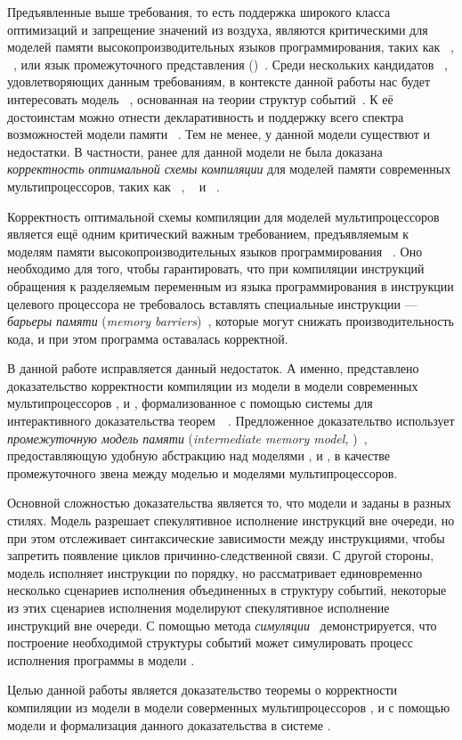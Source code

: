 Предъявленные выше требования, 
то есть поддержка широкого класса оптимизаций и 
запрещение значений из воздуха, являются 
критическими для моделей памяти высокопроизводительных 
языков программирования, таких как \CPP~\cite{Batty-al:POPL11}, 
\Java~\cite{Manson-al:POPL05}, или язык промежуточного представления \LLVM 
(\LLVMIR)~\cite{Chakraborty-Vafeiadis:CGO17}.
Среди нескольких кандидатов~%
\cite{Kang-al:POPL17,Paviotti-al:ESOP20,Jagadeesan-al:OOPSLA2020}, 
удовлетворяющих данным требованиям, в контексте данной работы нас будет 
интересовать модель \Wkm~\cite{Chakraborty-Vafeiadis:POPL19}, 
основанная на теории структур событий~\cite{Winskel:86}. 
К её достоинстам можно отнести декларативность и поддержку 
всего спектра возможностей модели памяти \CPP~\cite{Batty-al:POPL11}. 
Тем не менее, у данной модели существют и недостатки. 
В частности, ранее для данной модели не была доказана 
\emph{корректность оптимальной схемы компиляции} для моделей памяти 
современных мультипроцессоров, таких как 
\Intel~\cite{Sewell-al:CACM10}, \ARM~\cite{Pulte-al:POPL18} 
и \POWER~\cite{Alglave-al:TOPLAS14}. 
 
Корректность оптимальной схемы компиляции для моделей мультипроцессоров 
является ещё одним критический важным требованием, 
предъявляемым к моделям памяти высокопроизводительных языков программирования%
~\cite{Moiseenko-al:PCS21}.
Оно необходимо для того, чтобы гарантировать, 
что при компиляции инструкций обращения к разделяемым переменным 
из языка программирования в инструкции целевого процессора
не требовалось вставлять специальные инструкции --- 
\emph{барьеры памяти} (\emph{memory barriers})~\cite{McKenney:2010}, 
которые могут снижать производительность кода,
и при этом программа оставалась корректной. 

В данной работе исправляется данный недостаток. 
А именно, представлено доказательство корректности компиляции
из модели \Wkm в модели современных мультипроцессоров \Intel, \ARM и \POWER, 
формализованное с помощью системы для интерактивного 
доказательства теорем~\coq~\cite{Coq}.
Предложенное доказательтво использует \emph{промежуточную модель памяти}
(\emph{intermediate memory model, \IMM})~\cite{Podkopaev-al:POPL19}, 
предоставляющую удобную абстракцию над моделями \Intel, \ARM и \POWER, 
в качестве промежуточного звена между моделью \Wkm и моделями мультипроцессоров.

Основной сложностью доказательства является то, что модели \Wkm и \IMM
заданы в разных стилях. Модель \IMM разрешает спекулятивное 
исполнение инструкций вне очереди, но при этом 
отслеживает синтаксические зависимости между инструкциями, 
чтобы запретить появление циклов причинно-следственной связи. 
С другой стороны, модель \Wkm исполняет инструкции по порядку, 
но рассматривает единовременно несколько сценариев исполнения
объединенных в структуру событий,
некоторые из этих сценариев исполнения моделируют 
спекулятивное исполнение инструкций вне очереди. 
С помощью метода \emph{симуляции}~\cite{Milner:1971} 
демонстрируется, что построение необходимой структуры событий может 
симулировать процесс исполнения программы в модели \IMM.

\pagebreak


Целью данной работы является доказательство 
теоремы о корректности компиляции из модели \Wkm 
в модели соверменных мультипроцессоров \Intel, \ARM и \POWER
с помощью модели \IMM и формализация данного доказательства в системе \coq. 
